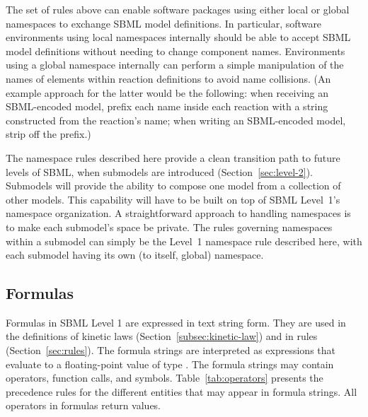 \documentclass[10pt]{cekarticle}
\newcommand{\vref}[1]{\ref{#1}}
\begin{document}
The set of rules above can enable software packages using either local or
global namespaces to exchange SBML model definitions.  In particular,
software environments using local namespaces internally should be able to
accept SBML model definitions without needing to change component names.
Environments using a global namespace internally can perform a simple
manipulation of the names of elements within reaction definitions to avoid
name collisions.  (An example approach for the latter would be the
following: when receiving an SBML-encoded model, prefix each name inside
each reaction with a string constructed from the reaction's name; when
writing an SBML-encoded model, strip off the prefix.)

The namespace rules described here provide a clean transition path to
future levels of SBML, when submodels are introduced
(Section~\ref{sec:level-2}).  Submodels will provide the ability to compose
one model from a collection of other models.  This capability will have to
be built on top of SBML Level~1's namespace organization.  A
straightforward approach to handling namespaces is to make each submodel's
space be private.  The rules governing namespaces within a submodel can
simply be the Level~1 namespace rule described here, with each submodel
having its own (to itself, global) namespace.


\subsection{Formulas}
\label{sec:formulas}

Formulas in SBML Level 1 are expressed in text string form.  They are used
in the definitions of kinetic laws (Section~\ref{subsec:kinetic-law}) and
in rules (Section~\ref{sec:rules}).  The formula strings are interpreted as
expressions that evaluate to a floating-point value of type .
The formula strings may contain operators, function calls, and symbols.
Table~\vref{tab:operators} presents the precedence rules
for the different entities that may appear in formula strings.  All
operators in formulas return  values.
\end{document}
